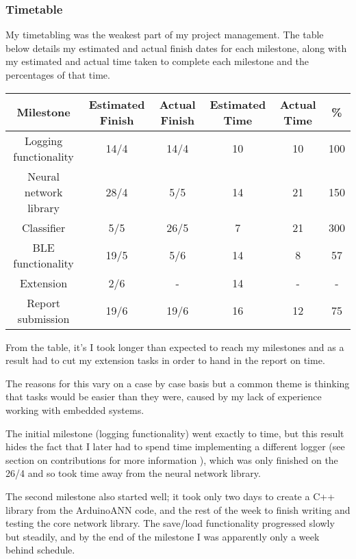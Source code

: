 \documentclass[a4paper]{article}
\begin{document}
\subsubsection{Timetable}

My timetabling was the weakest part of my project management. The table below details my estimated and actual finish dates for each milestone, along with my estimated and actual time taken to complete each milestone and the percentages of that time.

\begin{center}
  \begin{tabular}{|c|c|c|c|c|c|}
      \hline
      Milestone & Estimated Finish & Actual Finish & Estimated Time & Actual Time & \% \\
      \hline
      Logging functionality & 14/4 & 14/4 & 10 & 10 & 100 \\
      \hline
      Neural network library & 28/4 & 5/5 & 14 & 21 & 150 \\
      \hline
      Classifier & 5/5 & 26/5 & 7 & 21 & 300 \\
      \hline
      BLE functionality & 19/5 & 5/6 & 14 & 8 & 57\\
      \hline
      Extension & 2/6 & - & 14 & - & - \\
      \hline
      Report submission & 19/6 & 19/6 & 16 & 12 & 75\\
      \hline
      \end{tabular}
\end{center}

From the table, it's I took longer than expected to reach my milestones and as a result had to cut my extension tasks in order to hand in the report on time.

The reasons for this vary on a case by case basis but a common theme is thinking that tasks would be easier than they were, caused by my lack of experience working with embedded systems.

The initial milestone (logging functionality) went exactly to time, but this result hides the fact that I later had to spend time implementing a different logger (see section on contributions for more information ), which was only finished on the 26/4 and so took time away from the neural network library.

The second milestone also started well; it took only two days to create a C++ library from the ArduinoANN code, and the rest of the week to finish writing and testing the core network library. The save/load functionality progressed slowly but steadily, and by the end of the milestone I was apparently only a week behind schedule.
\end{document}
